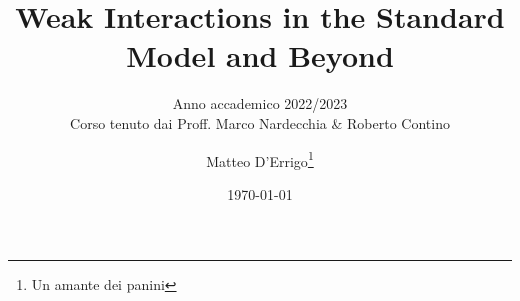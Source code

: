 \documentclass[
	fontsize=10pt, %
	twoside=false, %
	numbers=noenddot, %
]{kaobook}
\begin{document}

\subject{Appunti del corso di}

\title[Weak Interactions in the Standard Model and Beyond]{Weak Interactions in the Standard Model and Beyond}
\subtitle{Anno accademico 2022/2023\\Corso tenuto dai Proff. Marco Nardecchia \& Roberto Contino}

\author{Matteo D'Errigo\thanks{Un amante dei panini}}

\date{\today}



\frontmatter %




\makeatletter
\uppertitleback{\@titlehead} %
\end{document}
